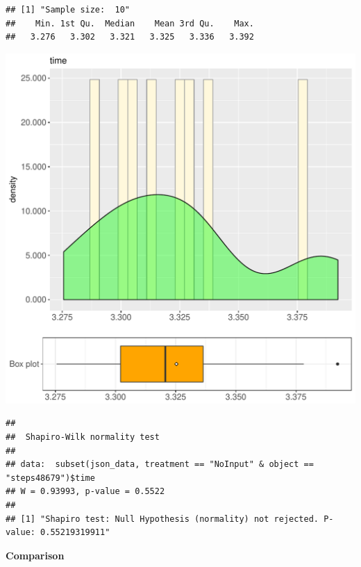 \documentclass{article}\usepackage[]{graphicx}\usepackage[]{color}
\makeatletter
\def\maxwidth{ %
  \ifdim\Gin@nat@width>\linewidth
    \linewidth
  \else
    \Gin@nat@width
  \fi
}
\newenvironment{kframe}{%
 \def\at@end@of@kframe{}%
 \ifinner\ifhmode%
  \def\at@end@of@kframe{\end{minipage}}%
  \begin{minipage}{\columnwidth}%
 \fi\fi%
 \def\FrameCommand##1{\hskip\@totalleftmargin \hskip-\fboxsep
 \colorbox{shadecolor}{##1}\hskip-\fboxsep
     \hskip-\linewidth \hskip-\@totalleftmargin \hskip\columnwidth}%
 \MakeFramed {\advance\hsize-\width
   \@totalleftmargin\z@ \linewidth\hsize
   \@setminipage}}%
 {\par\unskip\endMakeFramed%
 \at@end@of@kframe}
\newenvironment{knitrout}{}{} %
\makeatother
\begin{document}
\begin{knitrout}
\color{fgcolor}\begin{kframe}
\begin{verbatim}
## [1] "Sample size:  10"
##    Min. 1st Qu.  Median    Mean 3rd Qu.    Max. 
##   3.276   3.302   3.321   3.325   3.336   3.392
\end{verbatim}
\end{kframe}
\includegraphics[width=\maxwidth]{figure/RH4_NoInput_steps48679-1} 
\begin{kframe}\begin{verbatim}
## 
## 	Shapiro-Wilk normality test
## 
## data:  subset(json_data, treatment == "NoInput" & object == "steps48679")$time
## W = 0.93993, p-value = 0.5522
## 
## [1] "Shapiro test: Null Hypothesis (normality) not rejected. P-value: 0.55219319911"
\end{verbatim}
\end{kframe}
\end{knitrout}
  
 \textbf{Comparison}
  
\end{document}
